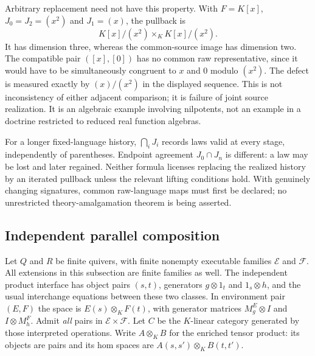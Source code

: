 \documentclass[11pt]{article}
\theoremstyle{definition}
\theoremstyle{remark}\newtheorem{remark}[theorem]{Remark}
\begin{document}
Arbitrary replacement need not have this property. With $F=K[x]$,
$J_0=J_2=(x^2)$ and $J_1=(x)$, the pullback is
\[
 K[x]/(x^2)\times_K K[x]/(x^2).
\]
It has dimension three, whereas the common-source image has dimension two.
The compatible pair $([x],[0])$ has no common raw representative, since it
would have to be simultaneously congruent to $x$ and $0$ modulo $(x^2)$.
The defect is measured exactly by $(x)/(x^2)$ in the displayed sequence.
This is not inconsistency of either adjacent comparison; it is failure of
joint source realization. It is an algebraic example involving nilpotents,
not an example in a doctrine restricted to reduced real function algebras.

For a longer fixed-language history, $\bigcap_iJ_i$ records laws valid at
every stage, independently of parentheses. Endpoint agreement
$J_0\cap J_n$ is different: a law may be lost and later regained.
Neither formula licenses replacing the realized history by an iterated
pullback unless the relevant lifting conditions hold. With genuinely
changing signatures, common raw-language maps must first be declared;
no unrestricted theory-amalgamation theorem is being asserted.

\subsection{Independent parallel composition}

Let $Q$ and $R$ be finite quivers, with finite nonempty executable families
$\mathcal E$ and $\mathcal F$. All extensions in this subsection are
finite families as well. The independent product interface has object pairs
$(s,t)$, generators $g\otimes1_t$ and $1_s\otimes h$, and the usual
interchange equations between these two classes. In environment pair
$(E,F)$ the space is $E(s)\otimes_K F(t)$, with generator matrices
$M^E_g\otimes I$ and $I\otimes M^F_h$. Admit \emph{all} pairs in
$\mathcal E\times\mathcal F$. Let $C$ be the $K$-linear category generated
by those interpreted operations. Write $A\otimes_K B$ for the enriched
tensor product: its objects are pairs and its hom spaces are
$A(s,s')\otimes_K B(t,t')$.
\end{document}

